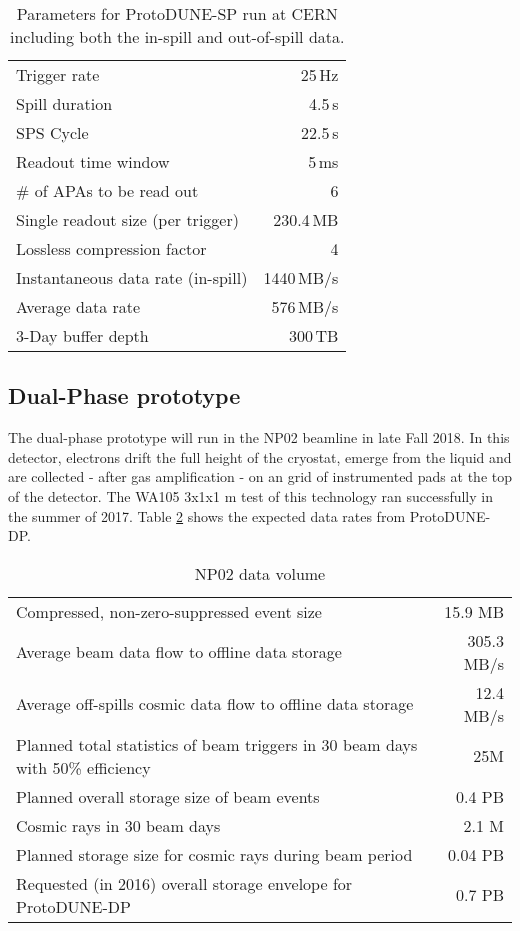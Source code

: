 \begin{enumerate}
\begin{table}[htbp]
  \centering
  \begin{tabular}[h]{l|r}
\hline
    Trigger rate & 25\,Hz \\
    Spill duration & 4.5\,s\\
    SPS Cycle & 22.5\,s \\
    Readout time window & 5\,ms \\
    \# of APAs to be read out & 6 \\
    \hline
    Single readout size (per trigger) & 230.4\,MB \\
    Lossless compression factor & 4 \\
    Instantaneous data rate (in-spill) & 1440\,MB/s \\
    Average data rate & 576\,MB/s \\
    \hline
    3-Day buffer depth & 300\,TB \\
    \hline
  \end{tabular}
  \caption{Parameters for ProtoDUNE-SP run at CERN including both
  the in-spill and out-of-spill data.}
  \label{tab:np04_data_rate}
\end{table}
\subsection{Dual-Phase prototype}

The dual-phase prototype will run in the NP02 beamline in late Fall 2018.  In this detector, electrons drift the full height of the cryostat, emerge from the liquid and are collected - after gas amplification - on an grid of instrumented pads at the top of the detector.  The WA105 3x1x1 m test of this technology ran successfully in the summer of 2017\cite{Murphy:20170516}.  Table \ref{tab:np02_data_rate} shows the expected data rates from ProtoDUNE-DP. 

\begin{table}[htbp]
  \centering
  \begin{tabular}[h]{l|r}
\hline
     Compressed, non-zero-suppressed event size & 15.9 MB\\
    Average beam data flow to offline data storage &   305.3 MB/s  \\
    Average off-spills cosmic data flow to offline data storage &   12.4 MB/s\\
    Planned total statistics of beam triggers in 30 beam days with 50\% efficiency&25M\\
    Planned overall storage size of beam events&   0.4 PB\\
   Cosmic rays in 30  beam days&  2.1  M\\
   Planned storage size for cosmic rays during beam period&  0.04 PB\\
   Requested (in 2016) overall storage envelope for ProtoDUNE-DP&0.7 PB \\
    \hline
  \end{tabular}
 \caption{NP02 data volume}
  \label{tab:np02_data_rate}
\end{table}


\end{enumerate}
